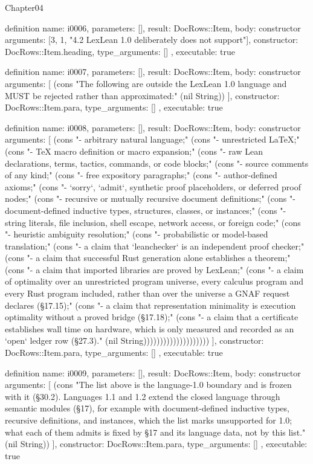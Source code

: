 \begin{lexlean}{Chapter04}
\begin{semanticmodule}
definition{
  name: i0006,
  parameters: [],
  result: DocRows::Item,
  body: constructor{
    arguments: [3, 1, "4.2 LexLean 1.0 deliberately does not support"],
    constructor: DocRows::Item.heading,
    type_arguments: []
  },
  executable: true
}

definition{
  name: i0007,
  parameters: [],
  result: DocRows::Item,
  body: constructor{
    arguments: [
      (cons "The following are outside the LexLean 1.0 language and MUST be rejected rather than approximated:" (nil String))
    ],
    constructor: DocRows::Item.para,
    type_arguments: []
  },
  executable: true
}

definition{
  name: i0008,
  parameters: [],
  result: DocRows::Item,
  body: constructor{
    arguments: [
      (cons "- arbitrary natural language;" (cons "- unrestricted LaTeX;" (cons "- TeX macro definition or macro expansion;" (cons "- raw Lean declarations, terms, tactics, commands, or code blocks;" (cons "- source comments of any kind;" (cons "- free expository paragraphs;" (cons "- author-defined axioms;" (cons "- `sorry`, `admit`, synthetic proof placeholders, or deferred proof nodes;" (cons "- recursive or mutually recursive document definitions;" (cons "- document-defined inductive types, structures, classes, or instances;" (cons "- string literals, file inclusion, shell escape, network access, or foreign code;" (cons "- heuristic ambiguity resolution;" (cons "- probabilistic or model-based translation;" (cons "- a claim that `leanchecker` is an independent proof checker;" (cons "- a claim that successful Rust generation alone establishes a theorem;" (cons "- a claim that imported libraries are proved by LexLean;" (cons "- a claim of optimality over an unrestricted program universe, every calculus program and every Rust program included, rather than over the universe a GNAF request declares (§17.15);" (cons "- a claim that representation minimality is execution optimality without a proved bridge (§17.18);" (cons "- a claim that a certificate establishes wall time on hardware, which is only measured and recorded as an `open` ledger row (§27.3)." (nil String))))))))))))))))))))
    ],
    constructor: DocRows::Item.para,
    type_arguments: []
  },
  executable: true
}

definition{
  name: i0009,
  parameters: [],
  result: DocRows::Item,
  body: constructor{
    arguments: [
      (cons "The list above is the language-1.0 boundary and is frozen with it (§30.2). Languages 1.1 and 1.2 extend the closed language through semantic modules (§17), for example with document-defined inductive types, recursive definitions, and instances, which the list marks unsupported for 1.0; what each of them admits is fixed by §17 and its language data, not by this list." (nil String))
    ],
    constructor: DocRows::Item.para,
    type_arguments: []
  },
  executable: true
}


\end{semanticmodule}
\end{lexlean}
